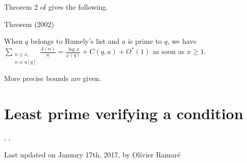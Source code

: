 Theorem 2 of
\cite{Ramare*02}
gives the following.
\begin{thm}{Theorem (2002)}

  When $q$ belongs to Rumely's list and $a$ is prime to $q$, we have
  $\displaystyle
  \sum_{\substack{n\le x,\\ n\equiv a[q]}}\frac{\Lambda(n)}{n}
  =\frac{\log x}{\varphi(q)}+C(q,a)+O^*(1)
  $
  as soon as $x\ge1$.
\end{thm}

More precise bounds are given.




\section{Least prime verifying a condition
}


\cite{Bach-Sorenson*96},
\cite{Kadiri*05-2},







  
  Last updated on January 17th, 2017, by Olivier Ramar\'e

















